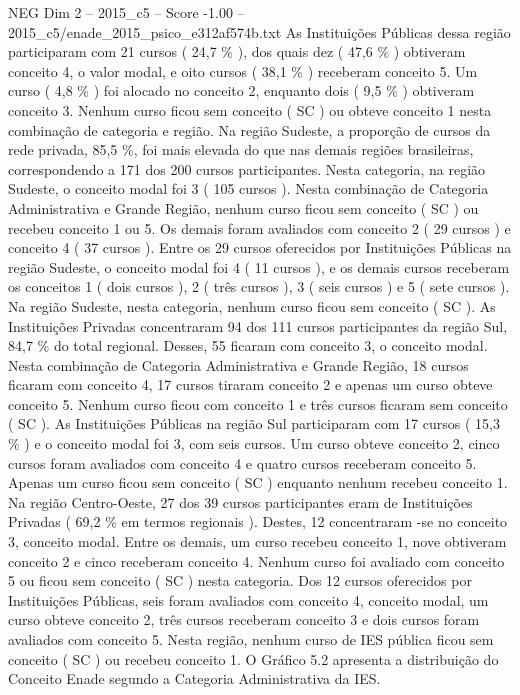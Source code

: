 \begin{textsample}{NEG Dim 2 – 2015\_c5 – Score -1.00 – 2015\_c5/enade\_2015\_psico\_e312af574b.txt}
As Instituições Públicas dessa região participaram com 21 cursos ( 24,7 \% ), dos quais dez ( 47,6 \% ) obtiveram conceito 4, o valor modal, e oito cursos ( 38,1 \% ) receberam conceito 5.
Um curso ( 4,8 \% ) foi alocado no conceito 2, enquanto dois ( 9,5 \% ) obtiveram conceito 3.
Nenhum curso ficou sem conceito ( SC ) ou obteve conceito 1 nesta combinação de categoria e região.
Na região Sudeste, a proporção de cursos da rede privada, 85,5 \%, foi mais elevada do que nas demais regiões brasileiras, correspondendo a 171 dos 200 cursos participantes.
Nesta categoria, na região Sudeste, o conceito modal foi 3 ( 105 cursos ).
Nesta combinação de Categoria Administrativa e Grande Região, nenhum curso ficou sem conceito ( SC ) ou recebeu conceito 1 ou 5.
Os demais foram avaliados com conceito 2 ( 29 cursos ) e conceito 4 ( 37 cursos ).
Entre os 29 cursos oferecidos por Instituições Públicas na região Sudeste, o conceito modal foi 4 ( 11 cursos ), e os demais cursos receberam os conceitos 1 ( dois cursos ), 2 ( três cursos ), 3 ( seis cursos ) e 5 ( sete cursos ).
Na região Sudeste, nesta categoria, nenhum curso ficou sem conceito ( SC ).
As Instituições Privadas concentraram 94 dos 111 cursos participantes da região Sul, 84,7 \% do total regional.
Desses, 55 ficaram com conceito 3, o conceito modal.
Nesta combinação de Categoria Administrativa e Grande Região, 18 cursos ficaram com conceito 4, 17 cursos tiraram conceito 2 e apenas um curso obteve conceito 5.
Nenhum curso ficou com conceito 1 e três cursos ficaram sem conceito ( SC ).
As Instituições Públicas na região Sul participaram com 17 cursos ( 15,3 \% ) e o conceito modal foi 3, com seis cursos.
Um curso obteve conceito 2, cinco cursos foram avaliados com conceito 4 e quatro cursos receberam conceito 5.
Apenas um curso ficou sem conceito ( SC ) enquanto nenhum recebeu conceito 1.
Na região Centro-Oeste, 27 dos 39 cursos participantes eram de Instituições Privadas ( 69,2 \% em termos regionais ).
Destes, 12 concentraram -se no conceito 3, conceito modal.
Entre os demais, um curso recebeu conceito 1, nove obtiveram conceito 2 e cinco receberam conceito 4.
Nenhum curso foi avaliado com conceito 5 ou ficou sem conceito ( SC ) nesta categoria.
Dos 12 cursos oferecidos por Instituições Públicas, seis foram avaliados com conceito 4, conceito modal, um curso obteve conceito 2, três cursos receberam conceito 3 e dois cursos foram avaliados com conceito 5.
Nesta região, nenhum curso de IES pública ficou sem conceito ( SC ) ou recebeu conceito 1.
O Gráfico 5.2 apresenta a distribuição do Conceito Enade segundo a Categoria Administrativa da IES.

\end{textsample}
